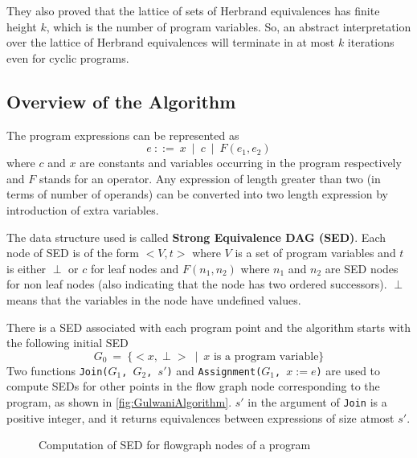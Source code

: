 They also proved that the lattice of sets of Herbrand equivalences 
has finite height $k$, which is the number of program variables. So, 
an abstract interpretation over the lattice of Herbrand equivalences 
will terminate in at most $k$ iterations even for cyclic programs.

\subsection{Overview of the Algorithm}
\label{subsec:OverviewOfTheAlgorithmGulwani}
The program expressions can be represented as
$$e\ ::=\ x\ \mid\ c\ \mid\ F(e_1, e_2)$$
where $c$ and $x$ are constants and variables occurring in the program 
respectively and $F$ stands for an operator. Any expression of length 
greater than two (in terms of number of operands) can be converted into 
two length expression by introduction of extra variables.

The data structure used is called \textbf{Strong Equivalence DAG 
(SED)}. Each node of SED is of the form $<V,t>$ where $V$ is a set of 
program variables and $t$ is either $\perp$ or $c$ for leaf nodes and 
$F(n_1, n_2)$ where $n_1$ and $n_2$ are SED nodes for non leaf nodes
(also indicating that the node has two ordered successors). $\perp$ 
means that the variables in the node have undefined values.

There is a SED associated with each program point and the algorithm
starts with the following initial SED
$$G_0\ =\ \{<x,\perp>\ \mid\ x \text{ is a program variable}\}$$ 
Two functions \texttt{Join($G_1$, $G_2$, $s'$)} and \texttt{Assignment($G_1$, $x := e$)} 
are used to compute SEDs for other points in the flow graph node 
corresponding to the program, as shown in \autoref{fig:GulwaniAlgorithm}. 
$s'$ in the argument of \texttt{Join} is a positive integer, and it 
returns equivalences between expressions of size atmost $s'$.

\begin{figure}[H]
    \caption{Computation of SED for flowgraph nodes of a program}
    \label{fig:GulwaniAlgorithm}
\end{figure}

